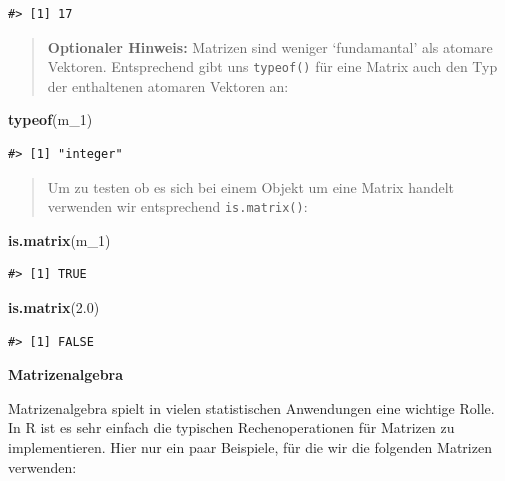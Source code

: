 \documentclass[]{book}
\newenvironment{Shaded}{\begin{snugshade}}{\end{snugshade}}
\newcommand{\KeywordTok}[1]{\textcolor[rgb]{0.13,0.29,0.53}{\textbf{#1}}}
\newcommand{\DecValTok}[1]{\textcolor[rgb]{0.00,0.00,0.81}{#1}}
\newcommand{\FloatTok}[1]{\textcolor[rgb]{0.00,0.00,0.81}{#1}}
\newcommand{\NormalTok}[1]{#1}
\begin{document}
\begin{verbatim}
#> [1] 17
\end{verbatim}

\begin{quote}
\textbf{Optionaler Hinweis:} Matrizen sind weniger `fundamantal' als
atomare Vektoren. Entsprechend gibt uns \texttt{typeof()} für eine
Matrix auch den Typ der enthaltenen atomaren Vektoren an:
\end{quote}

\begin{Shaded}
\begin{Highlighting}[]
\KeywordTok{typeof}\NormalTok{(m_}\DecValTok{1}\NormalTok{)}
\end{Highlighting}
\end{Shaded}

\begin{verbatim}
#> [1] "integer"
\end{verbatim}

\begin{quote}
Um zu testen ob es sich bei einem Objekt um eine Matrix handelt
verwenden wir entsprechend \texttt{is.matrix()}:
\end{quote}

\begin{Shaded}
\begin{Highlighting}[]
\KeywordTok{is.matrix}\NormalTok{(m_}\DecValTok{1}\NormalTok{)}
\end{Highlighting}
\end{Shaded}

\begin{verbatim}
#> [1] TRUE
\end{verbatim}

\begin{Shaded}
\begin{Highlighting}[]
\KeywordTok{is.matrix}\NormalTok{(}\FloatTok{2.0}\NormalTok{)}
\end{Highlighting}
\end{Shaded}

\begin{verbatim}
#> [1] FALSE
\end{verbatim}

\textbf{Matrizenalgebra}

Matrizenalgebra spielt in vielen statistischen Anwendungen eine wichtige
Rolle. In R ist es sehr einfach die typischen Rechenoperationen für
Matrizen zu implementieren. Hier nur ein paar Beispiele, für die wir die
folgenden Matrizen verwenden:
\end{document}
